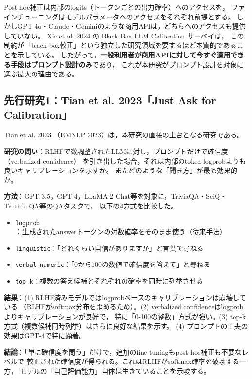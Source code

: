 \documentclass[11pt,a4paper,oneside]{article}
\begin{document}
Post-hoc補正は内部のlogits（トークンごとの出力確率）へのアクセスを，
ファインチューニングはモデルパラメータへのアクセスをそれぞれ前提とする。
しかしGPT-4o・Claude・Geminiのような商用APIは，どちらへのアクセスも提供していない。
Xie et al. 2024 \cite{xie2024blackboxsurvey} の Black-Box LLM Calibration サーベイは，
この制約が「black-box較正」という独立した研究領域を要するほど本質的であることを示している。
したがって，\textbf{一般利用者が商用APIに対して今すぐ適用できる手段はプロンプト設計のみ}であり，
これが本研究がプロンプト設計を対象に選ぶ最大の理由である。

\subsection{先行研究1：Tian et al. 2023「Just Ask for Calibration」}

Tian et al. 2023 \cite{tian2023justask}（EMNLP 2023）は，本研究の直接の土台となる研究である。

\textbf{研究の問い}：RLHFで微調整されたLLMに対し，プロンプトだけで確信度（verbalized confidence）
を引き出した場合，それは内部のtoken logprobよりも良いキャリブレーションを示すか。
またどのような「聞き方」が最も効果的か。

\textbf{方法}：GPT-3.5，GPT-4，LLaMA-2-Chat等を対象に，TriviaQA・SciQ・TruthfulQA等のQAタスクで，
以下の4方式を比較した。
\begin{itemize}
  \item \texttt{logprob}：生成されたanswerトークンの対数確率をそのまま使う（従来手法）
  \item \texttt{linguistic}：「どれくらい自信がありますか」と言葉で尋ねる
  \item \texttt{verbal numeric}：「0から100の数値で確信度を答えて」と尋ねる
  \item \texttt{top-k}：複数の答え候補とそれぞれの確率を同時に列挙させる
\end{itemize}

\textbf{結果}：(1) RLHF済みモデルではlogprobベースのキャリブレーションは崩壊している
（RLHFがsoftmax分布を歪めるため）。(2) verbalized confidenceはlogprobよりキャリブレーションが良好で，
特に「0-100の整数」方式が強い。(3) top-k方式（複数候補同時列挙）はさらに良好な結果を示す。
(4) プロンプトの工夫の効果はGPT-4で特に顕著。

\textbf{結論}：「単に確信度を問う」だけで，追加のfine-tuningもpost-hoc補正も不要なレベルで
較正された確信度が得られる。これはRLHFがsoftmax確率を破壊する一方，
モデルの「自己評価能力」自体は生きていることを示唆する。
\end{document}
